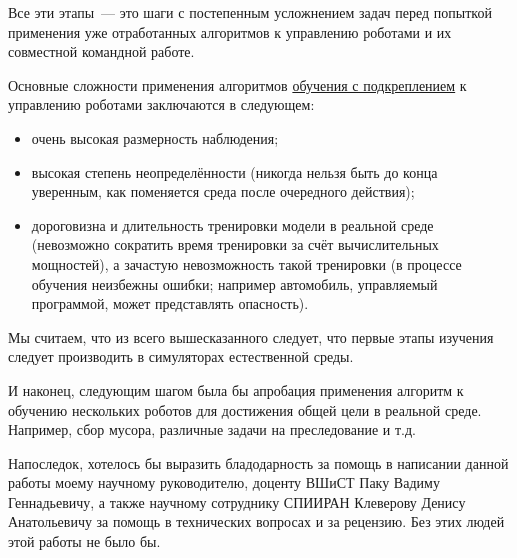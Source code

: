 Все эти этапы~--- это шаги с постепенным усложнением задач перед попыткой применения уже отработанных алгоритмов к управлению роботами и их совместной командной работе.

Основные сложности применения алгоритмов \hyperref[acr:rl]{обучения с подкреплением} к управлению роботами заключаются в следующем:
\begin{itemize}
    \item очень высокая размерность наблюдения;
    \item высокая степень неопределённости (никогда нельзя быть до конца уверенным, как поменяется среда после очередного действия);
    \item дороговизна и длительность тренировки модели в реальной среде (невозможно сократить время тренировки за счёт вычислительных мощностей), а зачастую невозможность такой тренировки (в процессе обучения неизбежны ошибки; например автомобиль, управляемый программой, может представлять опасность).
\end{itemize}

Мы считаем, что из всего вышесказанного следует, что первые этапы изучения следует производить в симуляторах естественной среды.

И наконец, следующим шагом была бы апробация применения алгоритм к обучению нескольких роботов для достижения общей цели в реальной среде. Например, сбор мусора, различные задачи на преследование и т.д.

Напоследок, хотелось бы выразить бладодарность за помощь в написании данной работы моему научному руководителю, доценту ВШиСТ Паку Вадиму Геннадьевичу, а также научному сотруднику СПИИРАН Клеверову Денису Анатольевичу за помощь в технических вопросах и за рецензию. Без этих людей этой работы не было бы.
